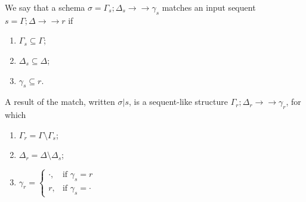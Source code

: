 \documentclass{article}
\theoremstyle{definition}
\newcommand{\fneuseqsymb}{
  \mathrel{\longrightarrow\!\!\!\!\!\!\!\!\longrightarrow}}
\newcommand{\fneuseq}[3]{#1 ; #2 \fneuseqsymb #3}
\begin{document}
\begin{definition}[Matching]
  We say that a schema $\sigma = \fneuseq{\Gamma_s}{\Delta_s}{\gamma_s}$ matches
  an input sequent $s = \fneuseq{\Gamma}{\Delta}{r}$ if

  \begin{enumerate}
  \item $\Gamma_s \subseteq \Gamma$;
  \item $\Delta_s \subseteq \Delta$;
  \item $\gamma_s \subseteq r$.
  \end{enumerate}
\end{definition}
\begin{definition}
  A result of the match, written $\sigma | s$, is a sequent-like structure
  $\fneuseq{\Gamma_r}{\Delta_r}{\gamma_r}$, for which

  \begin{enumerate}
  \item $\Gamma_r = \Gamma \setminus \Gamma_s$;
  \item $\Delta_r = \Delta \setminus \Delta_s$;
  \item $\gamma_r =
    \begin{cases}
      \cdot, & \text{if } \gamma_s = r \\
      r,     & \text{if } \gamma_s = \cdot
    \end{cases}$
  \end{enumerate}
\end{definition}
\end{document}
